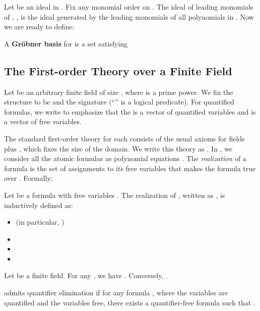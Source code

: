 \documentclass[envcountsect]{llncs}
\begin{document}
Let  be an ideal in . Fix any monomial order on . The ideal of leading
monomials of , , is the ideal generated by the leading monomials of all polynomials in . Now we are ready to define:
\begin{definition}
A {\bf Gr\"obner basis} for  is a set  satisfying  
\end{definition}

\subsection{The First-order Theory over a Finite Field}

Let  be an arbitrary finite field of size , where  is a prime power. We fix the structure to be  and the signature  (``'' is a logical predicate). For quantified formulas, we write  to emphasize that the  is a vector of quantified variables and  is a vector of free variables.

The standard first-order theory for each  consists of the usual axioms for fields \cite{modelbook} plus , which fixes the size of the domain. We write this theory as . In , we consider all the atomic formulas as polynomial equations . The {\em realization} of a formula is the set of assignments to its free variables that makes the formula true over . Formally:

\begin{definition}[Realization]
Let  be a formula with free variables . The realization of , written as , is inductively defined as:
\begin{itemize}
\item  (in particular, )

\item 

\item 

\item 
\end{itemize}
\end{definition}
\begin{proposition}
Let  be a finite field. For any , we have . Conversely, .
\end{proposition}
\begin{definition}
 admits quantifier elimination if for any formula , where the  variables are quantified and the  variables free, there exists a quantifier-free formula  such that . 
\end{definition}
\end{document}
